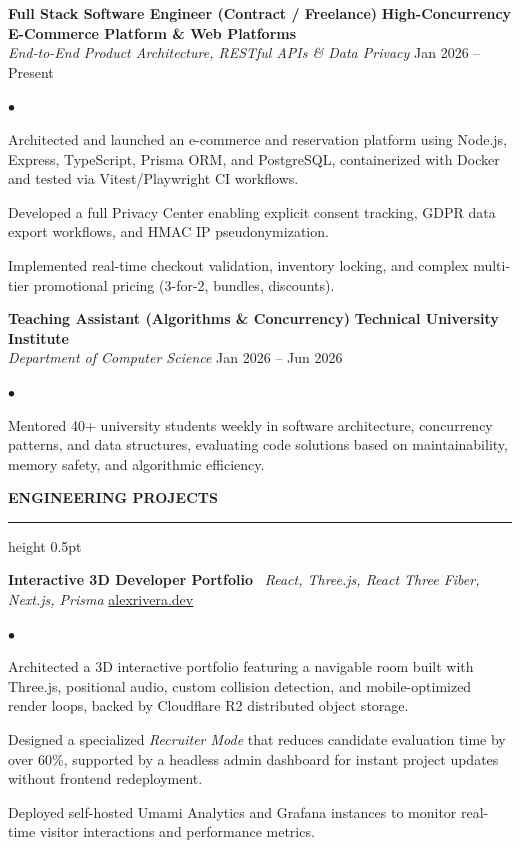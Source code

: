 \documentclass[10pt,letterpaper]{article}
\newcommand{\resumesection}[1]{%
  \vspace{2pt}%
  {\color{primary}\normalsize\bfseries\MakeUppercase{#1}}%
  \vspace{1pt}\hrule height 0.5pt\vspace{2pt}%
}
\renewenvironment{itemize}{%
  \begin{list}{\color{primary}$\bullet$}{%
    \setlength{\leftmargin}{1.1em}%
    \setlength{\itemsep}{0.5pt}%
    \setlength{\topsep}{1pt}%
    \setlength{\parsep}{0pt}%
    \setlength{\partopsep}{0pt}%
  }%
}{%
  \end{list}%
}
\begin{document}
\vspace{1.5pt}

\textbf{Full Stack Software Engineer (Contract / Freelance)} \hfill \textbf{High-Concurrency E-Commerce Platform \& Web Platforms} \\
\textit{End-to-End Product Architecture, RESTful APIs \& Data Privacy} \hfill Jan 2026 -- Present
\begin{itemize}
    \item Architected and launched an e-commerce and reservation platform using Node.js, Express, TypeScript, Prisma ORM, and PostgreSQL, containerized with Docker and tested via Vitest/Playwright CI workflows.
    \item Developed a full Privacy Center enabling explicit consent tracking, GDPR data export workflows, and HMAC IP pseudonymization.
    \item Implemented real-time checkout validation, inventory locking, and complex multi-tier promotional pricing (3-for-2, bundles, discounts).
\end{itemize}

\vspace{1.5pt}

\textbf{Teaching Assistant (Algorithms \& Concurrency)} \hfill \textbf{Technical University Institute} \\
\textit{Department of Computer Science} \hfill Jan 2026 -- Jun 2026
\begin{itemize}
    \item Mentored 40+ university students weekly in software architecture, concurrency patterns, and data structures, evaluating code solutions based on maintainability, memory safety, and algorithmic efficiency.
\end{itemize}

\resumesection{Engineering Projects}

\textbf{Interactive 3D Developer Portfolio} \textbar\ \textit{React, Three.js, React Three Fiber, Next.js, Prisma} \hfill \href{https://alexrivera.dev}{alexrivera.dev}
\begin{itemize}
    \item Architected a 3D interactive portfolio featuring a navigable room built with Three.js, positional audio, custom collision detection, and mobile-optimized render loops, backed by Cloudflare R2 distributed object storage.
    \item Designed a specialized \textit{Recruiter Mode} that reduces candidate evaluation time by over 60\%, supported by a headless admin dashboard for instant project updates without frontend redeployment.
    \item Deployed self-hosted Umami Analytics and Grafana instances to monitor real-time visitor interactions and performance metrics.
\end{itemize}
\end{document}
